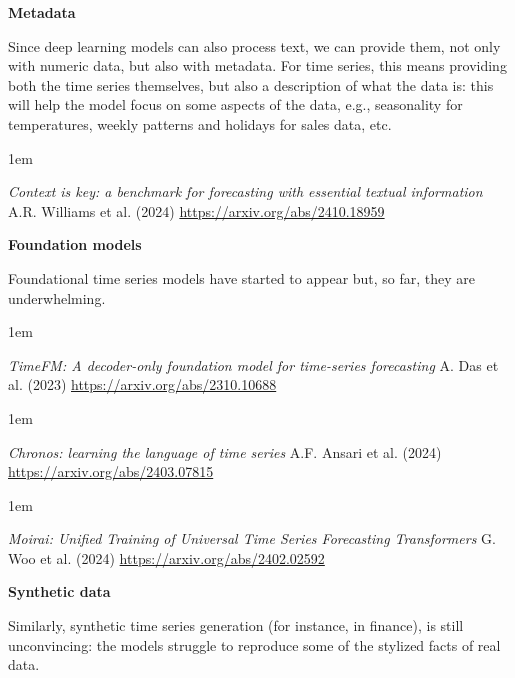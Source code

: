 \documentclass[a5paper]{article}
\newenvironment{reference}{%
  \medskip\goodbreak
  \parskip 0pt
  \raggedright
  \leftskip 1em
  \obeylines
}{\par\medskip\goodbreak}
\def\subsection#1{{\par\bigskip\goodbreak\large\bfseries #1\par}}
\begin{document}
\subsection{Metadata}

Since deep learning models can also process text,
we can provide them, not only with numeric data,
but also with metadata. For time series, this means
providing both the time series themselves, but also a description
of what the data is: this will help the model focus on some aspects of the data,
e.g., seasonality for temperatures, weekly patterns and holidays for sales data,
etc.

\begin{reference}
  \emph{Context is key: a benchmark for forecasting with essential textual information}
  A.R. Williams et al. (2024)
  \url{https://arxiv.org/abs/2410.18959}
\end{reference}

\subsection{Foundation models}

Foundational time series models have started to appear but,
so far, they are underwhelming.

\begin{reference}
  \emph{TimeFM: A decoder-only foundation model for time-series forecasting}
  A. Das et al. (2023)
  \url{https://arxiv.org/abs/2310.10688}
\end{reference}

\begin{reference}
  \emph{Chronos: learning the language of time series}
  A.F. Ansari et al. (2024)
  \url{https://arxiv.org/abs/2403.07815}
\end{reference}

\begin{reference}
  \emph{Moirai: Unified Training of Universal Time Series Forecasting Transformers}
  G. Woo et al. (2024)
  \url{https://arxiv.org/abs/2402.02592}
\end{reference}

\subsection{Synthetic data}

Similarly, synthetic time series generation (for instance, in finance),
is still unconvincing: the models struggle to reproduce some of the
stylized facts of real data.
\end{document}
